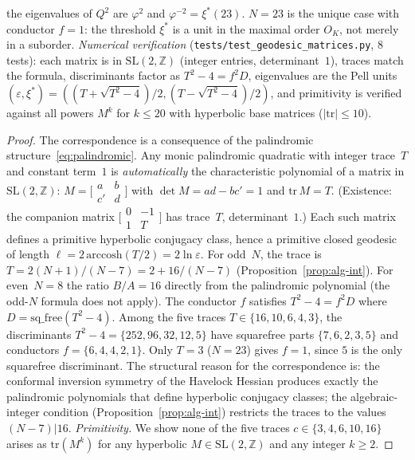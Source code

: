 \begin{proposition}
the eigenvalues of $Q^2$ are $\varphi^2$ and $\varphi^{-2} = \xi^*(23)$.
$N = 23$ is the unique case with conductor $f = 1$:
the threshold $\xi^*$ is a unit in the maximal order $O_K$, not
merely in a suborder.
\emph{Numerical verification}
(\texttt{tests/test\_geodesic\_matrices.py}, 8 tests):
each matrix is in $\mathrm{SL}(2,\mathbb{Z})$ (integer entries,
determinant~$1$), traces match the formula, discriminants factor
as $T^2{-}4 = f^2 D$, eigenvalues are the Pell units
$(\varepsilon, \xi^*) = ((T{+}\sqrt{T^2{-}4})/2,
(T{-}\sqrt{T^2{-}4})/2)$, and primitivity is verified against all
powers $M^k$ for $k \le 20$ with hyperbolic base matrices
($|\mathrm{tr}| \le 10$).
\end{proposition}

\begin{proof}
The correspondence is a consequence
of the palindromic structure~\eqref{eq:palindromic}.
Any monic palindromic quadratic with integer trace~$T$
and constant term~$1$ is \emph{automatically} the
characteristic polynomial of a matrix in
$\mathrm{SL}(2,\mathbb{Z})$:
$M = \bigl[\begin{smallmatrix}a&b\\c'&d\end{smallmatrix}\bigr]$
with $\det M = ad - bc' = 1$ and $\mathrm{tr}\,M = T$.
(Existence: the companion matrix
$\bigl[\begin{smallmatrix}0&-1\\1&T\end{smallmatrix}\bigr]$
has trace~$T$, determinant~$1$.)
Each such matrix defines a primitive hyperbolic conjugacy
class, hence a primitive closed geodesic of length
$\ell = 2\,\mathrm{arccosh}(T/2) = 2\ln\varepsilon$.
For odd~$N$, the trace is $T = 2(N{+}1)/(N{-}7) = 2 + 16/(N{-}7)$
(Proposition~\ref{prop:alg-int}).
For even~$N = 8$ the ratio $B/A = 16$ directly from the palindromic
polynomial (the odd-$N$ formula does not apply).
The conductor $f$ satisfies $T^2 - 4 = f^2 D$ where
$D = \mathrm{sq\_free}(T^2 - 4)$.
Among the five traces $T \in \{16, 10, 6, 4, 3\}$,
the discriminants $T^2 - 4 = \{252, 96, 32, 12, 5\}$
have squarefree parts $\{7, 6, 2, 3, 5\}$ and
conductors $f = \{6, 4, 4, 2, 1\}$.
Only $T = 3$ ($N = 23$) gives $f = 1$,
since $5$ is the only squarefree discriminant.
The structural reason for the correspondence is:
the conformal inversion symmetry of the Havelock
Hessian produces exactly the palindromic polynomials
that define hyperbolic conjugacy classes;
the algebraic-integer condition (Proposition~\ref{prop:alg-int})
restricts the traces to the values $(N{-}7) | 16$.
\emph{Primitivity.}
We show none of the five traces $c \in \{3, 4, 6, 10, 16\}$
arises as $\mathrm{tr}(M^k)$ for any hyperbolic
$M \in \mathrm{SL}(2,\mathbb{Z})$ and any integer $k \ge 2$.


\end{proof}
